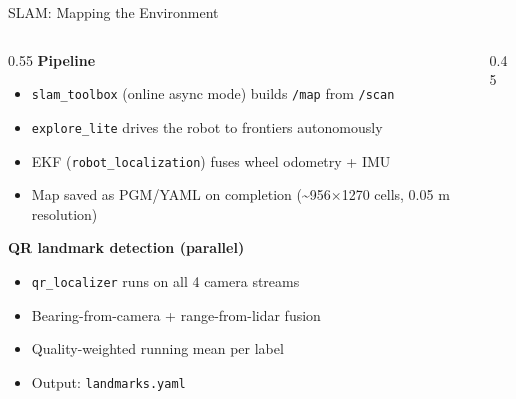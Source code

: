 \documentclass[10pt,aspectratio=169]{beamer}
\begin{document}
\begin{frame}{SLAM: Mapping the Environment}
  \begin{columns}[T]
    \begin{column}{0.55\textwidth}
      \textbf{Pipeline}
      \begin{itemize}
        \item \texttt{slam\_toolbox} (online async mode) builds \texttt{/map} from \texttt{/scan}
        \item \texttt{explore\_lite} drives the robot to frontiers autonomously
        \item EKF (\texttt{robot\_localization}) fuses wheel odometry + IMU
        \item Map saved as PGM/YAML on completion (\textasciitilde 956$\times$1270 cells, 0.05 m resolution)
      \end{itemize}
      \vspace{0.4em}
      \textbf{QR landmark detection (parallel)}
      \begin{itemize}
        \item \texttt{qr\_localizer} runs on all 4 camera streams
        \item Bearing-from-camera + range-from-lidar fusion
        \item Quality-weighted running mean per label
        \item Output: \texttt{landmarks.yaml}
      \end{itemize}
    \end{column}
    \begin{column}{0.45\textwidth}
      \centering
    \end{column}
  \end{columns}
\end{frame}
\end{document}
